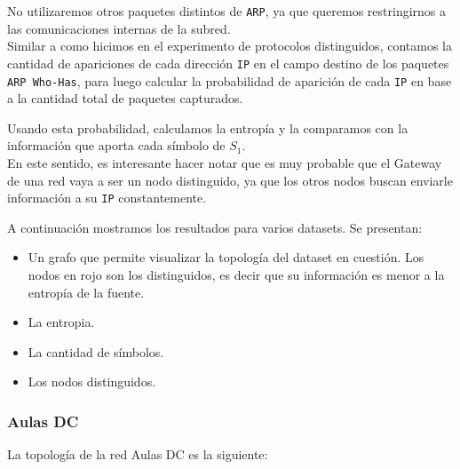No utilizaremos otros paquetes distintos de \texttt{ARP}, ya que queremos restringirnos a las comunicaciones internas de la subred. \\

Similar a como hicimos en el experimento de protocolos distinguidos, contamos la cantidad de apariciones de cada dirección \texttt{IP} en el campo destino de los paquetes \texttt{ARP Who-Has}, para luego calcular la probabilidad de aparición de cada \texttt{IP} en base a la cantidad total de paquetes capturados.

Usando esta probabilidad, calculamos la entropía y la comparamos con la información que aporta cada símbolo de $S_1$.\\

En este sentido, es interesante hacer notar que es muy probable que el Gateway de una red vaya a ser un nodo distinguido,
    ya que los otros nodos buscan enviarle información a su  \texttt{IP} constantemente.


A continuación mostramos los resultados para varios datasets. Se presentan:

\begin{itemize}
    \item Un grafo que permite visualizar la topología del dataset en cuestión. Los nodos en rojo son los distinguidos, es decir que su información es menor a la entropía de la fuente.
    \item La entropia.
    \item La cantidad de símbolos.
    \item Los nodos distinguidos.
\end{itemize}

\subsubsection{Aulas DC}

La topología de la red Aulas DC es la siguiente:

